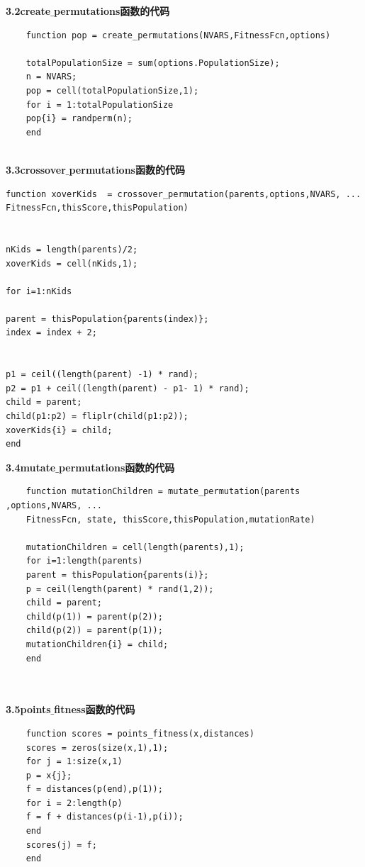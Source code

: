 \documentclass[UTF8]{ctexart}
\begin{document}
	\fontsize{14pt}{24pt}\begin{flushleft}
		\textbf{3.2create$\_$permutations函数的代码}
	\end{flushleft}
	\fontsize{12pt}{24pt} 
	\lstset{language=matlab}
	\begin{lstlisting}
	function pop = create_permutations(NVARS,FitnessFcn,options)
	
	totalPopulationSize = sum(options.PopulationSize);
	n = NVARS;
	pop = cell(totalPopulationSize,1);
	for i = 1:totalPopulationSize
	pop{i} = randperm(n); 
	end
	
	\end{lstlisting}
	
	\fontsize{14pt}{24pt}\begin{flushleft}
		\textbf{3.3crossover$\_$permutations函数的代码}
	\end{flushleft}
	\fontsize{12pt}{24pt} 
	\lstset{language=matlab}
	\begin{lstlisting}
function xoverKids  = crossover_permutation(parents,options,NVARS, ...
FitnessFcn,thisScore,thisPopulation)


nKids = length(parents)/2;
xoverKids = cell(nKids,1);

for i=1:nKids

parent = thisPopulation{parents(index)};
index = index + 2;


p1 = ceil((length(parent) -1) * rand);
p2 = p1 + ceil((length(parent) - p1- 1) * rand);
child = parent;
child(p1:p2) = fliplr(child(p1:p2));
xoverKids{i} = child;
end

	\end{lstlisting}
	
	\fontsize{14pt}{24pt}\begin{flushleft}
		\textbf{3.4mutate$\_$permutations函数的代码}
	\end{flushleft}
	\fontsize{12pt}{24pt} 
	\lstset{language=matlab}
	\begin{lstlisting}
	function mutationChildren = mutate_permutation(parents ,options,NVARS, ...
	FitnessFcn, state, thisScore,thisPopulation,mutationRate)

	mutationChildren = cell(length(parents),1);
	for i=1:length(parents)
	parent = thisPopulation{parents(i)};
	p = ceil(length(parent) * rand(1,2));
	child = parent;
	child(p(1)) = parent(p(2));
	child(p(2)) = parent(p(1));
	mutationChildren{i} = child;
	end
	
	
	\end{lstlisting}
	
	
	\fontsize{14pt}{24pt}\begin{flushleft}
		\textbf{3.5points$\_$fitness函数的代码}
	\end{flushleft}
	\fontsize{12pt}{24pt} 
	\lstset{language=matlab}
	\begin{lstlisting}
	function scores = points_fitness(x,distances)
	scores = zeros(size(x,1),1);
	for j = 1:size(x,1)
	p = x{j}; 
	f = distances(p(end),p(1));
	for i = 2:length(p)
	f = f + distances(p(i-1),p(i));
	end
	scores(j) = f;
	end
	
	\end{lstlisting}
	
\end{document}

